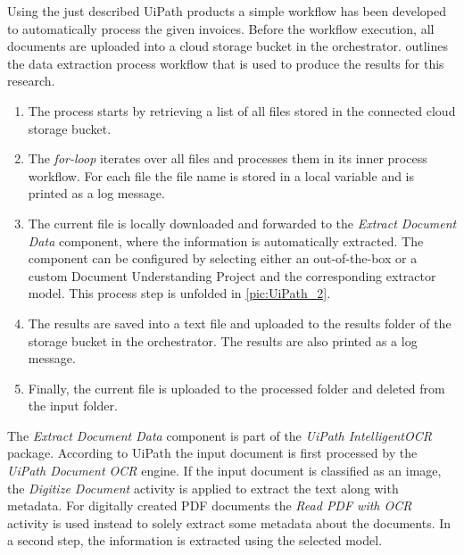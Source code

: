Using the just described UiPath products a simple workflow has been developed to automatically process the given invoices.
Before the workflow execution, all documents are uploaded into a cloud storage bucket in the orchestrator.  outlines the data extraction process workflow that is used to produce the results for this research. 
\begin{enumerate}
    \item The process starts by retrieving a list of all files stored in the connected cloud storage bucket. 
    \item The \textit{for-loop} iterates over all files and processes them in its inner process workflow. For each file the file name is stored in a local variable and is printed as a log message. 
    \item The current file is locally downloaded and forwarded to the \textit{Extract Document Data} component, where the information is automatically extracted. The component can be configured by selecting either an out-of-the-box or a custom Document Understanding Project and the corresponding extractor model. This process step is unfolded in \cref{pic:UiPath_2}.
    \item The results are saved into a text file and uploaded to the results folder of the storage bucket in the orchestrator. The results are also printed as a log message. 
    \item Finally, the current file is uploaded to the processed folder and deleted from the input folder.
\end{enumerate}

The \textit{Extract Document Data} component is part of the \textit{UiPath IntelligentOCR} package. According to UiPath \cite{uipath,uipathdoc} the input document is first processed by the \textit{UiPath Document OCR} engine. If the input document is classified as an image, the \textit{Digitize Document} activity is applied to extract the text along with metadata. For digitally created PDF documents the \textit{Read PDF with OCR} activity is used instead to solely extract some metadata about the documents.
In a second step, the information is extracted using the selected model.

